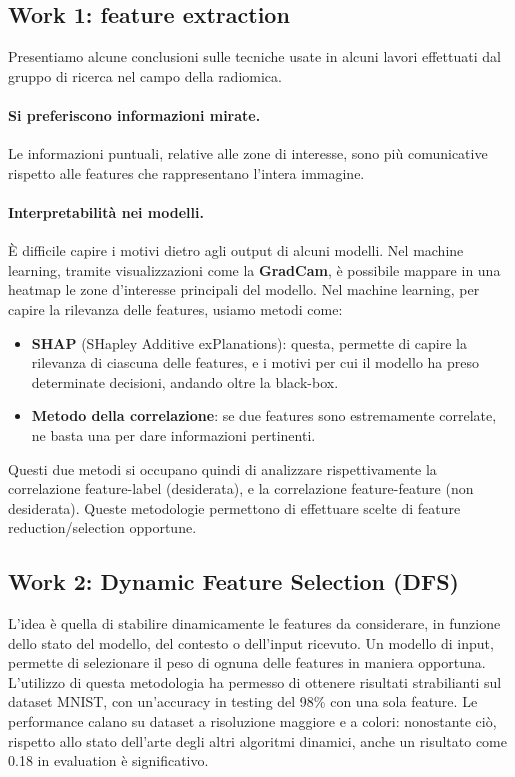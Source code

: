\subsection{Work 1: feature extraction }
Presentiamo alcune conclusioni sulle tecniche usate in alcuni lavori effettuati dal gruppo di ricerca nel campo della radiomica.

\paragraph{Si preferiscono informazioni mirate.} Le informazioni puntuali, relative alle zone di interesse, sono più comunicative rispetto alle features che rappresentano l'intera immagine. 

\paragraph{Interpretabilità nei modelli.} È difficile capire i motivi dietro agli output di alcuni modelli. Nel machine learning, tramite visualizzazioni come la \textbf{GradCam}, è possibile mappare in una heatmap le zone d'interesse principali del modello. Nel machine learning, per capire la rilevanza delle features, usiamo metodi come:

\begin{itemize}
	\item \textbf{SHAP} (SHapley Additive exPlanations): questa, permette di capire la rilevanza di ciascuna delle features, e i motivi per cui il modello ha preso determinate decisioni, andando oltre la black-box.
	
	\item \textbf{Metodo della correlazione}: se due features sono estremamente correlate, ne basta una per dare informazioni pertinenti.
\end{itemize} 

Questi due metodi si occupano quindi di analizzare rispettivamente la correlazione feature-label (desiderata), e la correlazione feature-feature (non desiderata). Queste metodologie permettono di effettuare scelte di feature reduction/selection opportune.

\subsection{Work 2: Dynamic Feature Selection (DFS)}
L'idea è quella di stabilire dinamicamente le features da considerare, in funzione dello stato del modello, del contesto o dell'input ricevuto. Un modello di input, permette di selezionare il peso di ognuna delle features in maniera opportuna. L'utilizzo di questa metodologia ha permesso di ottenere risultati strabilianti sul dataset MNIST, con un'accuracy in testing del 98\% con una sola feature. Le performance calano su dataset a risoluzione maggiore e a colori: nonostante ciò, rispetto allo stato dell'arte degli altri algoritmi dinamici, anche un risultato come 0.18 in evaluation è significativo.

